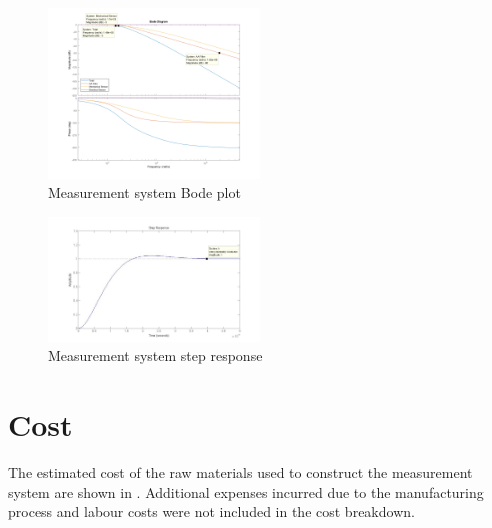 \documentclass[10pt,twocolumn]{witseiepaper}
\begin{document}
\begin{figure}[h!]
	\centering
	\includegraphics[width=0.5\textwidth]{bode_updated}
	\caption{Measurement system Bode plot}
	\label{fig:bode}
\end{figure}

\begin{figure}[h!]
	\centering
	\includegraphics[width=0.5\textwidth]{filterStep}
	\caption{Measurement system step response}
	\label{fig:step}
\end{figure}

\section{Cost}

The estimated cost of the raw materials used to construct the measurement system are shown in . Additional expenses incurred due to the manufacturing process and labour costs were not included in the cost breakdown.
\end{document}
